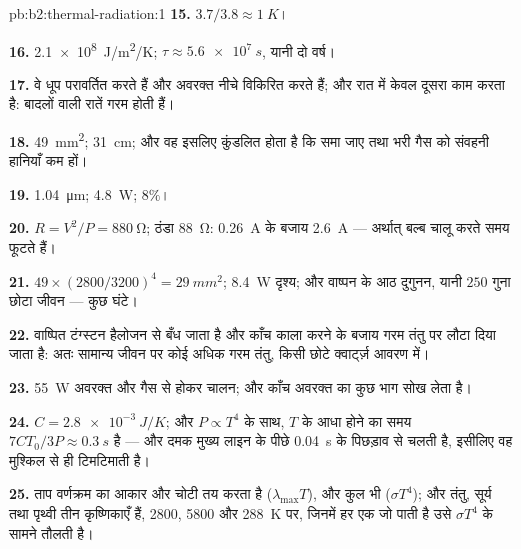 \begin{solution}{pb:b2:thermal-radiation:1}
\textbf{15.} $3.7/3.8 \approx \qty{1}{K}$।

\textbf{16.} \qty{2.1e8}{J/m^2/K}; $\tau \approx \qty{5.6e7}{s}$, यानी दो वर्ष।

\textbf{17.} वे धूप परावर्तित करते हैं और अवरक्त नीचे विकिरित करते हैं; और रात में
केवल दूसरा काम करता है: बादलों वाली रातें गरम होती हैं।

\textbf{18.} \qty{49}{mm^2}; \qty{31}{cm}; और वह इसलिए कुंडलित होता है कि समा जाए
तथा भरी गैस को संवहनी हानियाँ कम हों।

\textbf{19.} \qty{1.04}{\micro m}; \qty{4.8}{W}; $8\%$।

\textbf{20.} $R = V^2/P = \qty{880}{\ohm}$; ठंडा \qty{88}{\ohm}: \qty{0.26}{A} के बजाय
\qty{2.6}{A} --- अर्थात् बल्ब चालू करते समय फूटते हैं।

\textbf{21.} $49 \times (2800/3200)^4 = \qty{29}{mm^2}$; \qty{8.4}{W} दृश्य; और वाष्पन के आठ
दुगुनन, यानी $250$ गुना छोटा जीवन --- कुछ घंटे।

\textbf{22.} वाष्पित टंग्स्टन हैलोजन से बँध जाता है और काँच काला करने के
बजाय गरम तंतु पर लौटा दिया जाता है: अतः सामान्य जीवन पर कोई अधिक गरम
तंतु, किसी छोटे क्वार्ट्ज़ आवरण में।

\textbf{23.} \qty{55}{W} अवरक्त और गैस से होकर चालन; और काँच
अवरक्त का कुछ भाग सोख लेता है।

\textbf{24.} $C = \qty{2.8e-3}{J/K}$; और $P \propto T^4$ के साथ, $T$ के आधा होने का समय
$7CT_0/3P \approx \qty{0.3}{s}$ है --- और दमक मुख्य लाइन के पीछे
\qty{0.04}{s} के पिछड़ाव से चलती है, इसीलिए वह मुश्किल से ही टिमटिमाती है।

\textbf{25.} ताप वर्णक्रम का आकार और चोटी तय करता है
($\lambda_{\max}T$), और कुल भी ($\sigma T^4$); और तंतु, सूर्य तथा पृथ्वी
तीन कृष्णिकाएँ हैं, \qty{2800}{}, \qty{5800}{} और \qty{288}{K} पर, जिनमें हर एक
जो पाती है उसे $\sigma T^4$ के सामने तौलती है।
\end{solution}
